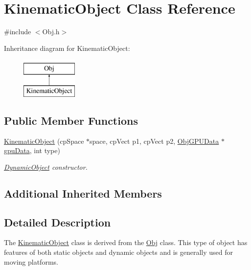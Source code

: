 \hypertarget{class_kinematic_object}{}\section{Kinematic\+Object Class Reference}
\label{class_kinematic_object}


{\ttfamily \#include $<$Obj.\+h$>$}

Inheritance diagram for Kinematic\+Object\+:\begin{figure}[H]
\begin{center}
\leavevmode
\includegraphics[height=2.000000cm]{class_kinematic_object}
\end{center}
\end{figure}
\subsection*{Public Member Functions}
\begin{DoxyCompactItemize}
\item 
\hyperlink{class_kinematic_object_a1ca8df2b3de129f3c820629b9a7ce039}{Kinematic\+Object} (cp\+Space $\ast$space, cp\+Vect p1, cp\+Vect p2, \hyperlink{class_obj_g_p_u_data}{Obj\+G\+P\+U\+Data} $\ast$\hyperlink{class_obj_a33a9a5371319a410f7d2d395a7ef2423}{gpu\+Data}, int type)
\begin{DoxyCompactList}\small\item\em \hyperlink{class_dynamic_object}{Dynamic\+Object} constructor. \end{DoxyCompactList}\end{DoxyCompactItemize}
\subsection*{Additional Inherited Members}


\subsection{Detailed Description}
The \hyperlink{class_kinematic_object}{Kinematic\+Object} class is derived from the \hyperlink{class_obj}{Obj} class. This type of object has features of both static objects and dynamic objects and is generally used for moving platforms. 

